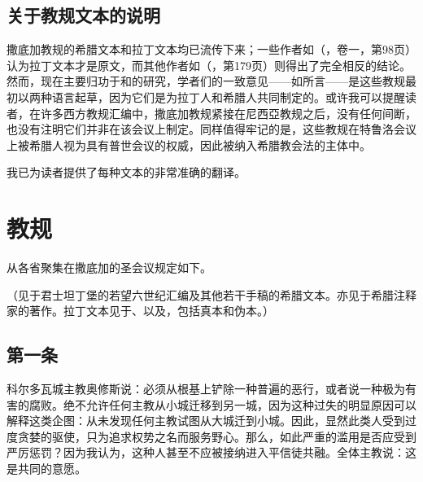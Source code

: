 
\subsection{关于教规文本的说明}

撒底加教规的希腊文本和拉丁文本均已流传下来；一些作者如（，卷一，第98页）认为拉丁文本才是原文，而其他作者如（，第179页）则得出了完全相反的结论。然而，现在主要归功于和的研究，学者们的一致意见——如所言——是这些教规最初以两种语言起草，因为它们是为拉丁人和希腊人共同制定的。或许我可以提醒读者，在许多西方教规汇编中，撒底加教规紧接在尼西亞教规之后，没有任何间断，也没有注明它们并非在该会议上制定。同样值得牢记的是，这些教规在特鲁洛会议上被希腊人视为具有普世会议的权威，因此被纳入希腊教会法的主体中。\par

我已为读者提供了每种文本的非常准确的翻译。\par


\section{教规}

从各省聚集在撒底加的圣会议规定如下。\par

（见于君士坦丁堡的若望六世纪汇编及其他若干手稿的希腊文本。亦见于希腊注释家的著作。拉丁文本见于、以及，包括真本和伪本。）\par


\subsection{第一条}

科尔多瓦城主教奥修斯说：必须从根基上铲除一种普遍的恶行，或者说一种极为有害的腐败。绝不允许任何主教从小城迁移到另一城，因为这种过失的明显原因可以解释这类企图：从未发现任何主教试图从大城迁到小城。因此，显然此类人受到过度贪婪的驱使，只为追求权势之名而服务野心。那么，如此严重的滥用是否应受到严厉惩罚？因为我认为，这种人甚至不应被接纳进入平信徒共融。全体主教说：这是共同的意愿。\par

